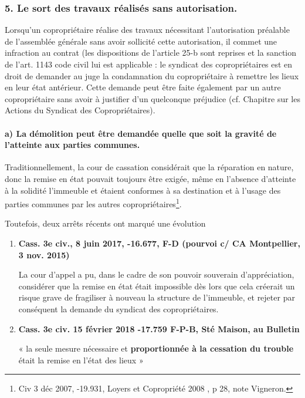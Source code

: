 		\subsubsection{5. Le sort des travaux réalisés sans autorisation.}
		
			Lorsqu’un copropriétaire réalise des travaux nécessitant l’autorisation préalable de l'assemblée générale sans avoir sollicité cette autorisation, il commet une infraction au contrat (les dispositions de l’article 25-b sont reprises et la sanction de l’art. 1143 code civil lui est applicable : le syndicat des copropriétaires est en droit de demander au juge la condamnation du copropriétaire à remettre les lieux en leur état antérieur. Cette demande peut être faite également par un autre copropriétaire sans avoir à justifier d’un quelconque préjudice (cf. Chapitre sur les Actions du Syndicat des Copropriétaires).
			
			\paragraph{a) La démolition peut être demandée quelle que soit la gravité de
			l’atteinte aux parties communes.}
			
				Traditionnellement, la cour de cassation considérait que la réparation en nature, donc la remise en état pouvait toujours être exigée, même en l’absence d’atteinte à la solidité l’immeuble et étaient conformes à sa destination et à l’usage des parties communes par les autres copropriétaires\footnote{Civ 3 déc 2007, -19.931, Loyers et Copropriété 2008 , p 28, note Vigneron.}.
				
				Toutefois, deux arrêts récents ont marqué une évolution
				\begin{enumerate}
					\item \textbf{Cass. 3e civ., 8 juin 2017, -16.677, F-D (pourvoi c/ CA Montpellier, 3 nov. 2015)}
					
					La cour d’appel a pu, dans le cadre de son pouvoir souverain d’appréciation, considérer que la remise en état était impossible dès lors que cela créerait un risque grave de fragiliser à nouveau la structure de l’immeuble, et rejeter par conséquent la demande du syndicat des copropriétaires.
					
					\item \textbf{Cass. 3e civ. 15 février 2018 -17.759 F-P-B, Sté Maison, au Bulletin}
					
					« la seule mesure nécessaire et \textbf{proportionnée à la cessation du trouble} était la remise en l'état des lieux »
				\end{enumerate}
				
